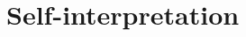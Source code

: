 \begin{comment}
To save space, we just
use the module returned by |CPST| as is. Because it does not
match the signature |Symantics|, we cannot apply the |EX| functor to it.
Nevertheless, we can write the tests.
\begin{code}
module T = struct
 module M = CPST(C)
 open M
 let test1 () = (* same as before *)
   app (lam (fun x -> x)) (bool true)
 let testpowfix () = ... (* same as before *)
 let testpowfix7 = (* same as before *)
    lam (fun x -> app (app (testpowfix ()) x)
                      (int 7))
end
\end{code}
We instantiate |CPST| with the desired base interpreter~|C|,
then use the result |M| to
interpret object terms. Those terms are \emph{exactly} as before.
Having to textually copy the terms is the
price we pay for this simplified treatment.
Our discussion of self\hyp interpretation in~\S\ref{selfinterp} shows
that this copying is not frivolous but represents plugging a term into
a context, which is one of the many faces of polymorphism.

With 
|CPST| instantiated by the compiler~|C| above,
|T.test1| gives
\begin{code}
.<fun x_5 ->
  (fun x_2 -> x_2 (fun x_3 x_4 -> x_4 x_3))
  (fun x_6 -> (fun x_1 -> x_1 true)
              (fun x_7 -> x_6 x_7 x_5))>.
\end{code}
This output is a na\"{\i}ve CPS transformation of $(\fun{x}x)\True$,
containing several apparent $\beta$-redexes.  To eliminate these
redexes, we just change~|T| to instantiate |CPST| with |P| instead.
\begin{code}
{P.st = Some <fun>;
 P.dy = .<fun x_5 -> x_5 true>.}
\end{code}

\subsection{State and imperative features}
\label{state}

We can modify the CBV CPS transformation to pass a piece of state along
with the continuation. This technique lets us support mutable state. We
can also add mutable references to the object language using mutable
references of the metalanguage.  The accompanying code illustrates these
extensions.
\end{comment}


\ifshort\else
\section{Self-interpretation}\label{selfinterp}

